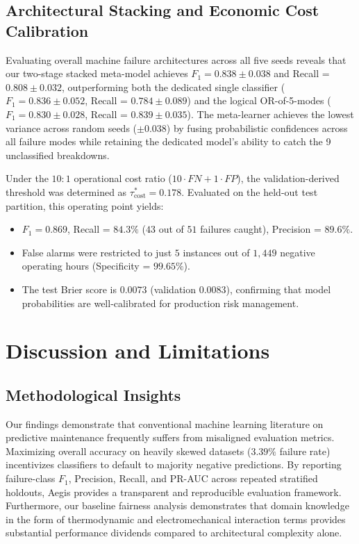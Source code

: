 \documentclass[conference]{IEEEtran}
\begin{document}
\begin{itemize}
\subsection{Architectural Stacking and Economic Cost Calibration}
Evaluating overall machine failure architectures across all five seeds reveals that our two-stage stacked meta-model achieves $F_1 = 0.838 \pm 0.038$ and Recall = $0.808 \pm 0.032$, outperforming both the dedicated single classifier ($F_1 = 0.836 \pm 0.052$, Recall = $0.784 \pm 0.089$) and the logical OR-of-5-modes ($F_1 = 0.830 \pm 0.028$, Recall = $0.839 \pm 0.035$). The meta-learner achieves the lowest variance across random seeds ($\pm 0.038$) by fusing probabilistic confidences across all failure modes while retaining the dedicated model's ability to catch the 9 unclassified breakdowns.

Under the $10:1$ operational cost ratio ($10 \cdot FN + 1 \cdot FP$), the validation-derived threshold was determined as $\tau_{\text{cost}}^* = 0.178$. Evaluated on the held-out test partition, this operating point yields:
\begin{itemize}
    \item $F_1 = 0.869$, Recall = $\mathbf{84.3\%}$ ($43$ out of $51$ failures caught), Precision = $\mathbf{89.6\%}$.
    \item False alarms were restricted to just $5$ instances out of $1,449$ negative operating hours (Specificity = $99.65\%$).
    \item The test Brier score is $\mathbf{0.0073}$ (validation $0.0083$), confirming that model probabilities are well-calibrated for production risk management.
\end{itemize}

\section{Discussion and Limitations}

\subsection{Methodological Insights}
Our findings demonstrate that conventional machine learning literature on predictive maintenance frequently suffers from misaligned evaluation metrics. Maximizing overall accuracy on heavily skewed datasets ($3.39\%$ failure rate) incentivizes classifiers to default to majority negative predictions. By reporting failure-class $F_1$, Precision, Recall, and PR-AUC across repeated stratified holdouts, Aegis provides a transparent and reproducible evaluation framework. Furthermore, our baseline fairness analysis demonstrates that domain knowledge in the form of thermodynamic and electromechanical interaction terms provides substantial performance dividends compared to architectural complexity alone.


\end{itemize}
\end{document}
